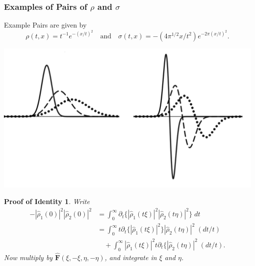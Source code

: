 \documentclass[usenames,dvipsnames,12pt]{beamer}
\newtheorem*{proofofidentity}{Proof of Identity}
\begin{document}
\begin{frame}
    \frametitle{Examples of Pairs of $\rho$ and $\sigma$}

    Example Pairs are given by
    \[ \rho(t,x) = t^{-1} e^{-(x/t)^2} \quad\text{and}\quad \sigma(t,x) = - (4 \pi^{1/2} x / t^2) e^{-2 \pi (x/t)^2}. \]
    \begin{center}
    \includegraphics[scale=0.2]{JDJFrhoandsigma.png}
    \end{center}
\end{frame}

\begin{frame}
    \begin{proofofidentity}
    Write
    \vspace{-0.5em}
    \begin{align*}
        - |\widehat{\rho}_1(0)|^2 |\widehat{\rho}_2(0)|^2 &= \int_0^\infty \partial_t \{ |\widehat{\rho}_1(t \xi)|^2 |\widehat{\rho}_2(t \eta)|^2 \}\; dt\\
        &= \int_0^\infty t \partial_t \{ |\widehat{\rho}_1(t \xi)|^2 \} |\widehat{\rho}_2(t \eta)|^2\; (dt / t)\\
        &\quad + \int_0^\infty |\widehat{\rho}_1(t \xi)|^2 t \partial_t \{ |\widehat{\rho}_2(t \eta)|^2\; (dt / t).
    \end{align*}
    Now multiply by $\widehat{\mathbf{F}}(\xi, -\xi, \eta, - \eta)$, and integrate in $\xi$ and $\eta$.
    \end{proofofidentity}
\end{frame}
\end{document}
